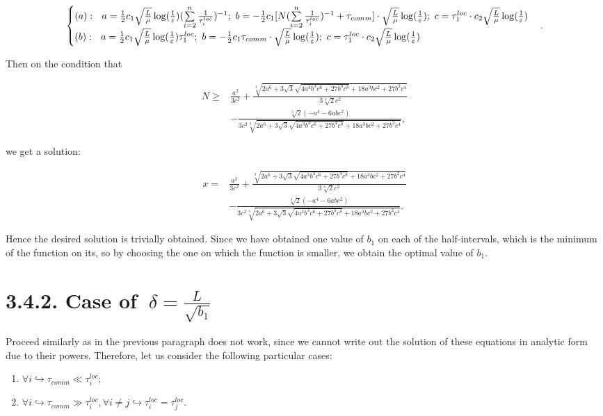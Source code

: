 \documentclass{article}
\theoremstyle{definition}
\theoremstyle{plain}
\begin{document}
\begin{eqnarray}
\notag
    \begin{cases}
    (a): ~ ~ a = \frac{1}{2} c_1 \sqrt{\frac{L}{\mu}}\log (\frac{1}{\varepsilon})(\sum\limits_{i = 2}^{n} \frac{1}{\tau_i^{loc}})^{-1}; ~
b = -\frac{1}{2} c_1 [N (\sum\limits_{i = 2}^{n} \frac{1}{\tau_i^{loc}})^{-1} + \tau_{comm}]\cdot 
\sqrt{\frac{L}{\mu}}\log (\frac{1}{\varepsilon});~ c = \tau_1^{loc}\cdot c_2  \sqrt{\frac{L}{\mu}}\log (\frac{1} {\varepsilon})
    \\
\notag
    (b): ~ ~ a = \frac{1}{2} c_1  \sqrt{\frac{L}{\mu}}\log (\frac{1}{\varepsilon})\tau_1^{loc}; ~ 
b = -\frac{1}{2}c_1 \tau_{comm}\cdot \sqrt{\frac{L}{\mu}}\log (\frac{1}{\varepsilon}); ~
c = \tau_1^{loc}\cdot c_2  \sqrt{\frac{L}{\mu}}\log (\frac{1} {\varepsilon})
    \end{cases}.
\end{eqnarray}

Then on the condition that 

\begin{align*}
    N \geq &\frac{a^2}{3 c^2}+\frac{\sqrt[3]{2 a^6+3 \sqrt{3} \sqrt{4 a^3 b^3 c^6+27 b^4 c^8}+18 a^3 b c^2+27 b^2 c^4}}{3 \sqrt[3]{2} c^2} \\
    &- \frac{\sqrt[3]{2}\left(-a^4-6 a b c^2\right) }{3 c^2 \sqrt[3]{2 a^6+3 \sqrt{3} \sqrt{4 a^3 b^3 c^6+27 b^4 c^8}+18 a^3 b c^2+27 b^2 c^4}},
\end{align*}

we get a solution:

\begin{align*}
     x=&\frac{a^2}{3 c^2}+\frac{\sqrt[3]{2 a^6+3 \sqrt{3} \sqrt{4 a^3 b^3 c^6+27 b^4 c^8}+18 a^3 b c^2+27 b^2 c^4}}{3 \sqrt[3]{2} c^2}\\ 
     &-\frac{\sqrt[3]{2}\left(-a^4-6 a b c^2\right)} 
    {3 c^2 \sqrt[3]{2 a^6+3 \sqrt{3} \sqrt{4 a^3 b^3 c^6+27 b^4 c^8}+18 a^3 b c^2+27 b^2 c^4}}.
\end{align*}

Hence the desired solution is trivially obtained. Since we have obtained one value of $b_1$ on each of the half-intervals, which is the minimum of the function on its, so by choosing the one on which the function is smaller, we obtain the optimal value of $b_1$.

\section*{3.4.2. Case of $~\delta = \frac{L}{\sqrt{b_1}}$}\label{eq:3.4.2}
Proceed similarly as in the previous paragraph does not work, since we cannot write out the solution of these equations in analytic form due to their powers.
Therefore, let us consider the following particular cases:
\begin{enumerate}
    \item $\forall i\hookrightarrow \tau_{comm} \ll \tau_i^{loc};$
    \item $\forall i\hookrightarrow \tau_{comm} \gg \tau_i^{loc}, \forall i\neq j\hookrightarrow \tau_i^{loc} = \tau_j^{loc}.$
\end{enumerate}
\end{document}
